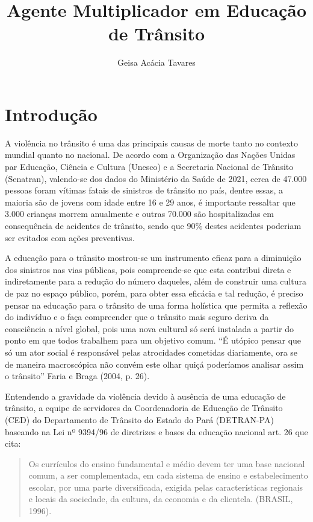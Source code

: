 \documentclass[output=paper,colorlinks,citecolor=brown]{langscibook}
\author{Geisa Acácia Tavares\orcid{}\affiliation{Analista de Trânsito: Estatístico} }
\title{Agente Multiplicador em Educação de Trânsito}
\begin{document}
\maketitle

\section{Introdução} 

A violência no trânsito é uma das principais causas de morte tanto no contexto mundial quanto no nacional. De acordo com a Organização das Nações Unidas par Educação, Ciência e Cultura (Unesco) e a Secretaria Nacional de Trânsito (Senatran), valendo-se dos dados do Ministério da Saúde de 2021, cerca de 47.000 pessoas foram vítimas fatais de sinistros de trânsito no país, dentre essas, a maioria são de jovens com idade entre 16 e 29 anos, é importante ressaltar que 3.000 crianças morrem anualmente e outras 70.000 são hospitalizadas em consequência de acidentes de trânsito, sendo que 90\% destes acidentes poderiam ser evitados com ações preventivas.\vskip0.3cm

A educação para o trânsito mostrou-se um instrumento eficaz para a diminuição dos sinistros nas vias públicas, pois compreende-se que esta contribui direta e indiretamente para a redução do número daqueles, além de construir uma cultura de paz no espaço público, porém, para obter essa eficácia e tal redução, é preciso pensar na educação para o trânsito de uma forma holística que permita a reflexão do indivíduo e o faça compreender que o trânsito mais seguro deriva da consciência a nível global, pois uma nova cultural só será instalada a partir do ponto em que todos trabalhem para um objetivo comum. “É utópico pensar que só um ator social é responsável pelas atrocidades cometidas diariamente, ora se de maneira macroscópica não convém este olhar quiçá poderíamos analisar assim o trânsito” Faria e Braga (2004, p. 26).\vskip0.3cm

Entendendo a gravidade da violência devido à ausência de uma educação de trânsito, a equipe de servidores da Coordenadoria de Educação de Trânsito (CED) do Departamento de Trânsito do Estado do Pará (DETRAN-PA) baseando na Lei nº 9394/96 de diretrizes e bases da educação nacional art. 26 que cita: \vskip0.3cm

\begin{quote}
      Os currículos do ensino fundamental e médio devem ter uma base nacional comum, a ser complementada, em cada sistema de ensino e estabelecimento escolar, por uma parte diversificada, exigida pelas características regionais e locais da sociedade, da cultura, da economia e da clientela. (BRASIL, 1996).\vskip0.3cm
\end{quote}
\end{document}
